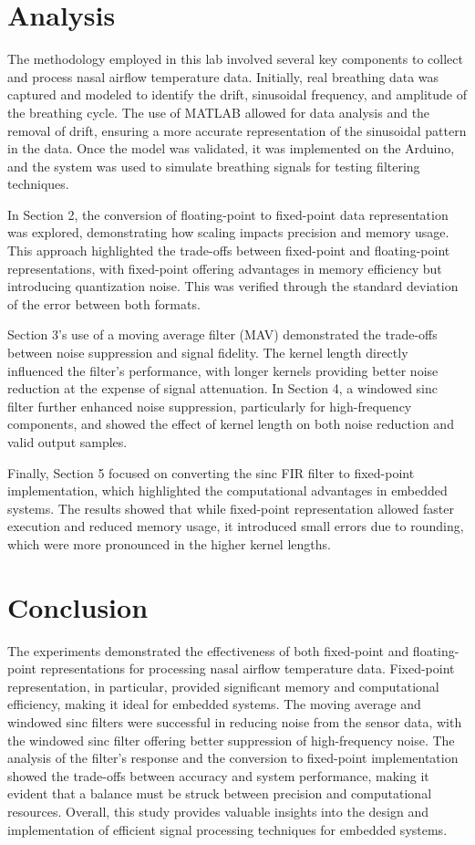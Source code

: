 \documentclass[journal]{IEEEtran}
\begin{document}
\section{Analysis}

The methodology employed in this lab involved several key components to collect and process nasal airflow temperature data. Initially, real breathing data was captured and modeled to identify the drift, sinusoidal frequency, and amplitude of the breathing cycle. The use of MATLAB allowed for data analysis and the removal of drift, ensuring a more accurate representation of the sinusoidal pattern in the data. Once the model was validated, it was implemented on the Arduino, and the system was used to simulate breathing signals for testing filtering techniques.

In Section 2, the conversion of floating-point to fixed-point data representation was explored, demonstrating how scaling impacts precision and memory usage. This approach highlighted the trade-offs between fixed-point and floating-point representations, with fixed-point offering advantages in memory efficiency but introducing quantization noise. This was verified through the standard deviation of the error between both formats.

Section 3’s use of a moving average filter (MAV) demonstrated the trade-offs between noise suppression and signal fidelity. The kernel length directly influenced the filter’s performance, with longer kernels providing better noise reduction at the expense of signal attenuation. In Section 4, a windowed sinc filter further enhanced noise suppression, particularly for high-frequency components, and showed the effect of kernel length on both noise reduction and valid output samples.

Finally, Section 5 focused on converting the sinc FIR filter to fixed-point implementation, which highlighted the computational advantages in embedded systems. The results showed that while fixed-point representation allowed faster execution and reduced memory usage, it introduced small errors due to rounding, which were more pronounced in the higher kernel lengths.

\section{Conclusion}

The experiments demonstrated the effectiveness of both fixed-point and floating-point representations for processing nasal airflow temperature data. Fixed-point representation, in particular, provided significant memory and computational efficiency, making it ideal for embedded systems. The moving average and windowed sinc filters were successful in reducing noise from the sensor data, with the windowed sinc filter offering better suppression of high-frequency noise. The analysis of the filter’s response and the conversion to fixed-point implementation showed the trade-offs between accuracy and system performance, making it evident that a balance must be struck between precision and computational resources. Overall, this study provides valuable insights into the design and implementation of efficient signal processing techniques for embedded systems.
\end{document}
